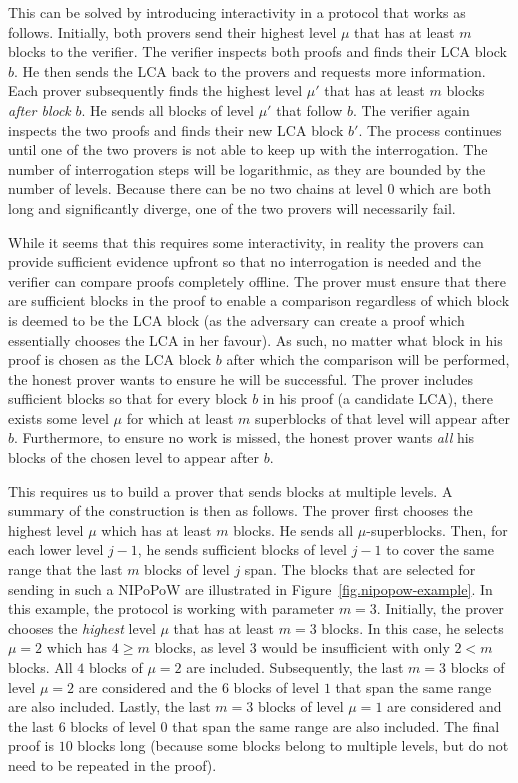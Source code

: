 This can be solved by introducing interactivity in a protocol that works as
follows. Initially, both provers send their highest level $\mu$ that has at
least $m$ blocks to the verifier. The verifier inspects both proofs and finds
their LCA block $b$. He then sends the LCA back to the provers and requests more
information. Each prover subsequently finds the highest level $\mu'$ that has at
least $m$ blocks \emph{after block} $b$. He sends all blocks of level $\mu'$ that
follow $b$. The verifier again inspects the two
proofs and finds their new LCA block $b'$. The process continues until one of the
two provers is not able to keep up with the interrogation. The number of
interrogation steps will be logarithmic, as they are bounded by the number of
levels. Because there can be
no two chains at level $0$ which are both long and significantly diverge, one of
the two provers will necessarily fail.

While it seems that this requires some interactivity, in reality the provers can
provide sufficient evidence upfront so that no interrogation is needed and the verifier can compare proofs
completely
offline. The prover must ensure that there are sufficient blocks in the proof to
enable a comparison regardless of which block is deemed to be the LCA block (as
the adversary can create a proof which essentially chooses the LCA in her
favour). As such, no matter what block in his proof is chosen as the LCA block
$b$ after which the comparison will be performed, the honest prover wants to
ensure he will be successful. The prover includes sufficient blocks so that for
every block $b$ in his proof (a candidate LCA), there exists some level $\mu$
for which at least $m$ superblocks of that level will appear after $b$.
Furthermore, to ensure no work is missed, the honest prover wants \emph{all} his
blocks of the chosen level to appear after $b$.

This requires us to build a prover that sends blocks at multiple levels. A
summary of the construction is then as follows. The prover first chooses the
highest level $\mu$ which has at least $m$ blocks. He sends all
$\mu$-superblocks. Then, for each lower level $j - 1$, he sends sufficient
blocks of level $j - 1$ to cover the same range that the last $m$ blocks of level
$j$ span. The blocks that are selected for sending in such a NIPoPoW are
illustrated in Figure~\ref{fig.nipopow-example}. In this example, the protocol is
working with parameter $m = 3$. Initially, the prover chooses the \emph{highest}
level $\mu$ that has at least $m = 3$ blocks. In this case, he selects $\mu = 2$
which has $4 \geq m$ blocks, as level $3$ would be insufficient with only $2 <
m$ blocks. All $4$ blocks of $\mu = 2$ are included. Subsequently, the last
$m = 3$ blocks of level $\mu = 2$ are considered and the $6$ blocks of level $1$
that span the same range are also included. Lastly, the last $m = 3$ blocks of
level $\mu = 1$ are considered and the last $6$ blocks of level $0$ that span the
same range are also included. The final proof is $10$ blocks long (because some
blocks belong to multiple levels, but do not need to be repeated in the proof).

